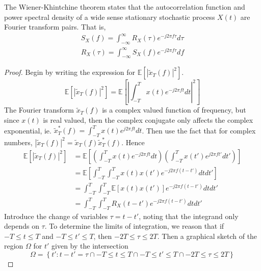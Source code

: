 \documentclass[11pt]{report} %
\begin{document}
The Wiener-Khintchine theorem states that the autocorrelation function and power spectral density of a wide sense stationary stochastic process $X\left(t\right)$ are Fourier transform pairs. That is,
\begin{gather}
S_{X}\left(f\right) = \int_{-\infty}^{\infty}R_{X}\left(\tau\right)e^{-j2\pi f\tau}d\tau \\
R_{X}\left(\tau\right) = \int_{-\infty}^{\infty}S_{X}\left(f\right)e^{-j2\pi f\tau}df
\end{gather}
\begin{proof}
Begin by writing the expression for $\mathbb{E}\left[\left|\widetilde{x}_{T}\left(f\right)\right|^{2}\right]$.
\begin{equation}
\mathbb{E}\left[\left|\widetilde{x}_{T}\left(f\right)\right|^{2}\right] = \mathbb{E}\left[\left|\int_{-T}^{T}x\left(t\right)e^{-j2\pi ft}dt\right|^{2}\right]
\end{equation}
The Fourier transform $\widetilde{x}_{T}\left(f\right)$ is a complex valued function of frequency, but since $x\left(t\right)$ is real valued, then the complex conjugate only affects the complex exponential, ie. $\widetilde{x}_{T}^{*}\left(f\right) = \int_{-T}^{T}x\left(t\right)e^{j2\pi ft}dt$. Then use the fact that for complex numbers, $\left|\widetilde{x}_{T}\left(f\right)\right|^{2} = \widetilde{x}_{T}\left(f\right)\widetilde{x}_{T}^{*}\left(f\right)$. Hence
\begin{align}
\mathbb{E}\left[\left|\widetilde{x}_{T}\left(f\right)\right|^{2}\right] &= \mathbb{E}\left[\left(\int_{-T}^{T}x\left(t\right)e^{-j2\pi ft}dt\right)\left(\int_{-T}^{T}x\left(t'\right)e^{j2\pi ft'}dt'\right)\right] \\
&= \mathbb{E}\left[\int_{-T}^{T}\int_{-T}^{T}x\left(t\right)x\left(t'\right)e^{-j2\pi f\left(t-t'\right)}dtdt'\right] \\
&= \int_{-T}^{T}\int_{-T}^{T}\mathbb{E}\left[x\left(t\right)x\left(t'\right)\right]e^{-j2\pi f\left(t-t'\right)}dtdt' \\
&= \int_{-T}^{T}\int_{-T}^{T}R_{X}\left(t-t'\right)e^{-j2\pi f\left(t-t'\right)}dtdt'
\end{align}
Introduce the change of variables $\tau = t - t'$, noting that the integrand only depends on $\tau$. To determine the limits of integration, we reason that if $-T\leq t \leq T$ and $-T \leq t'\leq T$, then $-2T \leq \tau \leq 2T$. Then a graphical sketch of the region $\Omega$ for $t'$ given by the intersection
\begin{equation}
\Omega = \left\{t': t - t' = \tau \cap -T\leq t \leq T \cap -T \leq t'\leq T \cap -2T \leq \tau \leq 2T\right\}

\end{equation}
\end{proof}
\end{document}
